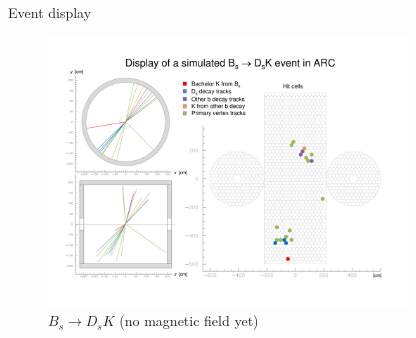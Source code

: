 \documentclass{beamer}
\begin{document}
\begin{frame}{Event display}
  \begin{figure}
    \centering
    \includegraphics[width = 0.85\textwidth, trim = {0cm 2cm 0cm 0cm}, clip = true]{Plots/Display2.pdf}
    \caption{$B_s\to D_sK$ (no magnetic field yet)}
  \end{figure}
\end{frame}
\end{document}
